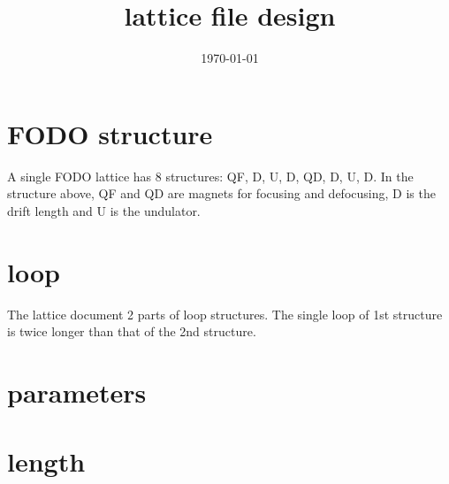 \documentclass[10pt,CCT]{ctexart}
\begin{document}
\title{lattice file design}
 \date{\today}%

\maketitle
\thispagestyle{empty}

\section{FODO structure}
A single FODO lattice has 8 structures: QF, D, U, D, QD, D, U, D. 
In the structure above, QF and QD are magnets for focusing and defocusing, D is the drift length and U is the undulator. 
 
\section{loop}
The lattice document 2 parts of loop structures. The single loop of 1st structure is twice longer than that of the 2nd structure. 


\section{parameters}



\section{length}
\end{document}
